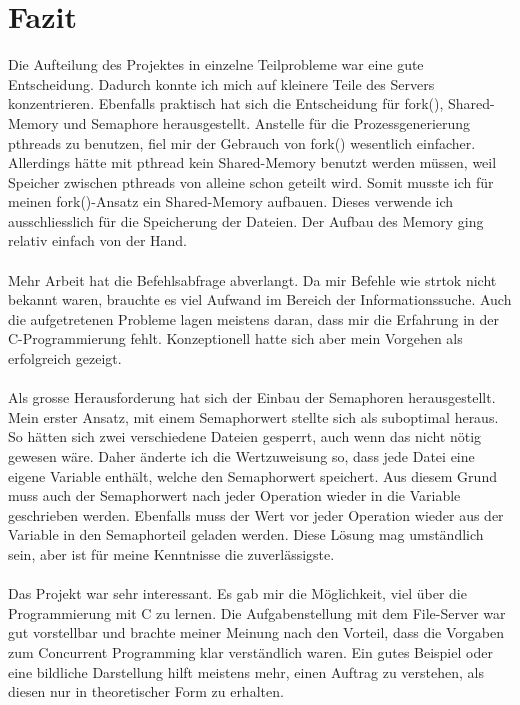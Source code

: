 \documentclass[12pt,a4paper,ngerman]{report}
\begin{document}
\chapter{Fazit}
Die Aufteilung des Projektes in einzelne Teilprobleme war eine gute Entscheidung. Dadurch konnte ich mich auf kleinere Teile des Servers konzentrieren. Ebenfalls praktisch hat sich die Entscheidung für fork(), Shared-Memory und Semaphore herausgestellt. Anstelle für die Prozessgenerierung pthreads zu benutzen, fiel mir der Gebrauch von fork() wesentlich einfacher. Allerdings hätte mit pthread kein Shared-Memory benutzt werden müssen, weil Speicher zwischen pthreads von alleine schon geteilt wird. Somit musste ich für meinen fork()-Ansatz ein Shared-Memory aufbauen. Dieses verwende ich ausschliesslich für die Speicherung der Dateien. Der Aufbau des Memory ging relativ einfach von der Hand.\\
\\
Mehr Arbeit hat die Befehlsabfrage abverlangt. Da mir Befehle wie strtok nicht bekannt waren, brauchte es viel Aufwand im Bereich der Informationssuche. Auch die aufgetretenen Probleme lagen meistens daran, dass mir die Erfahrung in der C-Programmierung fehlt. Konzeptionell hatte sich aber mein Vorgehen als erfolgreich gezeigt. \\
\\
Als grosse Herausforderung hat sich der Einbau der Semaphoren herausgestellt. Mein erster Ansatz, mit einem Semaphorwert stellte sich als suboptimal heraus. So hätten sich zwei verschiedene Dateien gesperrt, auch wenn das nicht nötig gewesen wäre. Daher änderte ich die Wertzuweisung so, dass jede Datei eine eigene Variable enthält, welche den Semaphorwert speichert. Aus diesem Grund muss auch der Semaphorwert nach jeder Operation wieder in die Variable geschrieben werden. Ebenfalls muss der Wert vor jeder Operation wieder aus der Variable in den Semaphorteil geladen werden. Diese Lösung mag umständlich sein, aber ist für meine Kenntnisse die zuverlässigste.\\
\\
Das Projekt war sehr interessant. Es gab mir die Möglichkeit, viel über die Programmierung mit C zu lernen. Die Aufgabenstellung mit dem File-Server war gut vorstellbar und brachte meiner Meinung nach den Vorteil, dass die Vorgaben zum Concurrent Programming klar verständlich waren. Ein gutes Beispiel oder eine bildliche Darstellung hilft meistens mehr, einen Auftrag zu verstehen, als diesen nur in theoretischer Form zu erhalten.
\end{document}
